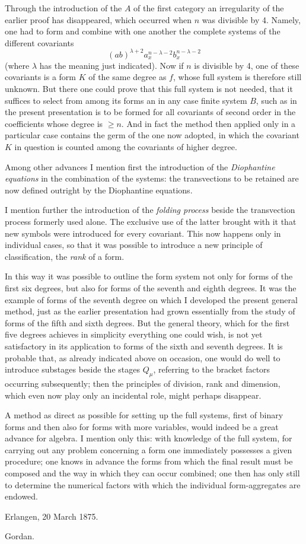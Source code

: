 \documentclass[10pt]{article}
\begin{document}
Through the introduction of the $A$ of the first category an irregularity of the earlier proof has disappeared, which occurred when $n$ was divisible by 4. Namely, one had to form and combine with one another the complete systems of the different covariants
\[
(ab)^{\lambda+2}a_x^{n-\lambda-2}b_x^{n-\lambda-2}
\]
(where $\lambda$ has the meaning just indicated). Now if $n$ is divisible by 4, one of these covariants is a form $K$ of the same degree as $f$, whose full system is therefore still unknown. But there one could prove that this full system is not needed, that it suffices to select from among its forms an in any case finite system $B$, such as in the present presentation is to be formed for all covariants of second order in the coefficients whose degree is $\geq n$. And in fact the method then applied only in a particular case contains the germ of the one now adopted, in which the covariant $K$ in question is counted among the covariants of higher degree.

Among other advances I mention first the introduction of the \textit{Diophantine equations} in the combination of the systems: the transvections to be retained are now defined outright by the Diophantine equations.

I mention further the introduction of the \textit{folding process} beside the transvection process formerly used alone. The exclusive use of the latter brought with it that new symbols were introduced for every covariant. This now happens only in individual cases, so that it was possible to introduce a new principle of classification, the \textit{rank} of a form.

In this way it was possible to outline the form system not only for forms of the first six degrees, but also for forms of the seventh and eighth degrees. It was the example of forms of the seventh degree on which I developed the present general method, just as the earlier presentation had grown essentially from the study of forms of the fifth and sixth degrees. But the general theory, which for the first five degrees achieves in simplicity everything one could wish, is not yet satisfactory in its application to forms of the sixth and seventh degrees. It is probable that, as already indicated above on occasion, one would do well to introduce substages beside the stages $Q_\mu$, referring to the bracket factors occurring subsequently; then the principles of division, rank and dimension, which even now play only an incidental role, might perhaps disappear.

A method as direct as possible for setting up the full systems, first of binary forms and then also for forms with more variables, would indeed be a great advance for algebra. I mention only this: with knowledge of the full system, for carrying out any problem concerning a form one immediately possesses a given procedure; one knows in advance the forms from which the final result must be composed and the way in which they can occur combined; one then has only still to determine the numerical factors with which the individual form-aggregates are endowed.

\begin{flushleft}
Erlangen, 20 March 1875.
\end{flushleft}
\begin{flushright}
Gordan.
\end{flushright}
\end{document}
